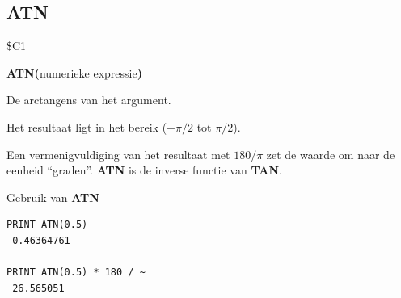 \subsection{ATN}
\begin{description}[leftmargin=2cm,style=nextline]
\item [Token:]    \$C1

\item [Formaat:]   {\bf ATN(}numerieke expressie{\bf)}

\item [Retourneert:]  De arctangens van het argument.

                  Het resultaat ligt in het bereik ($-\pi/2$ tot $\pi/2$).

\item [Opmerkingen:]  Een vermenigvuldiging van het resultaat met $180/\pi$ zet de waarde om naar de eenheid ``graden''. {\bf ATN} is de inverse functie van {\bf TAN}.

\item [Voorbeelden:] Gebruik van {\bf ATN}

\begin{tcolorbox}[colback=black,coltext=white]
\verbatimfont{\codefont}
\begin{verbatim}
PRINT ATN(0.5)
 0.46364761

PRINT ATN(0.5) * 180 / ~
 26.565051
\end{verbatim}
\end{tcolorbox}
\end{description}


\newpage
